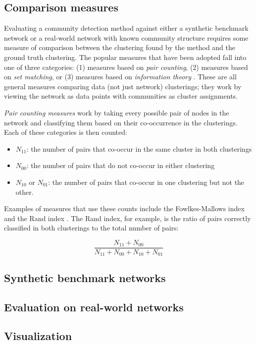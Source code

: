 \subsection{Comparison measures}\label{comparison-measures}

Evaluating a community detection method against either a synthetic
benchmark network or a real-world network with known community structure
requires some measure of comparison between the clustering found by the
method and the ground truth clustering. The popular measures that have
been adopted fall into one of three categories: (1) measures based on
\emph{pair counting}, (2) measures based on \emph{set matching}, or (3)
measures based on \emph{information theory}
\autocites{meila_comparing_2007}{vinh_information_2010}. These are all
general measures comparing data (not just network) clusterings; they
work by viewing the network as data points with communities as cluster
assignments.

\emph{Pair counting measures} work by taking every possible pair of
nodes in the network and classifying them based on their co-occurrence
in the clusterings. Each of these categories is then counted:

\begin{itemize}
\tightlist
\item
  \(N_{11}\): the number of pairs that co-occur in the same cluster in
  both clusterings
\item
  \(N_{00}\): the number of pairs that do not co-occur in either
  clustering
\item
  \(N_{10}\) or \(N_{01}\): the number of pairs that co-occur in one
  clustering but not the other.
\end{itemize}

Examples of measures that use these counts include the Fowlkes-Mallows
index \autocite{fowlkes_method_1983} and the Rand index
\autocite{rand_objective_1971}. The Rand index, for example, is the
ratio of pairs correctly classified in both clusterings to the total
number of pairs:

\[\frac{N_{11} + N_{00}}{N_{11} + N_{00} + N_{10} + N_{01}}\]

\subsection{Synthetic benchmark
networks}\label{synthetic-benchmark-networks}

\subsection{Evaluation on real-world
networks}\label{evaluation-on-real-world-networks}

\subsection{Visualization}\label{visualization}
